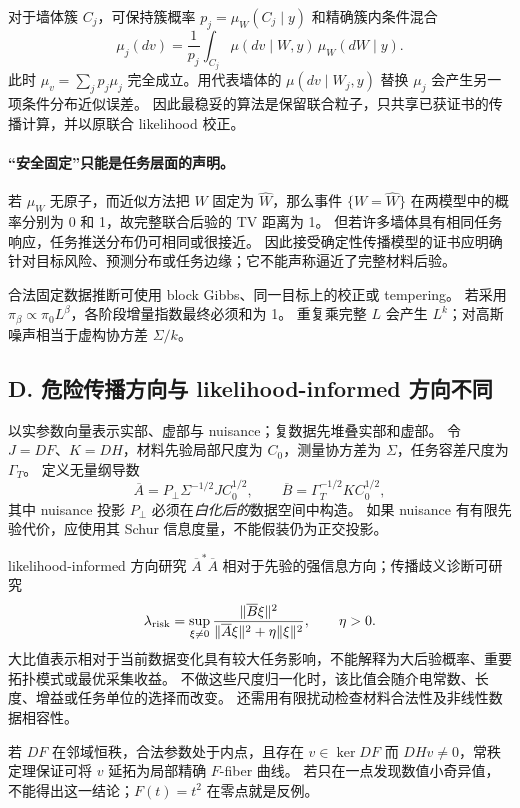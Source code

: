 对于墙体簇 $C_j$，可保持簇概率
$p_j=\mu_W(C_j\mid y)$ 和精确簇内条件混合
\[
 \mu_j(dv)=\frac{1}{p_j}\int_{C_j}\mu(dv\mid W,y)\,\mu_W(dW\mid y).
\]
此时 $\mu_v=\sum_jp_j\mu_j$ 完全成立。用代表墙体的
$\mu(dv\mid W_j,y)$ 替换 $\mu_j$ 会产生另一项条件分布近似误差。
因此最稳妥的算法是保留联合粒子，只共享已获证书的传播计算，并以原联合 likelihood 校正。

\paragraph{``安全固定''只能是任务层面的声明。}
若 $\mu_W$ 无原子，而近似方法把 $W$ 固定为 $\widehat W$，那么事件
$\{W=\widehat W\}$ 在两模型中的概率分别为 0 和 1，故完整联合后验的 TV 距离为 1。
但若许多墙体具有相同任务响应，任务推送分布仍可相同或很接近。
因此接受确定性传播模型的证书应明确针对目标风险、预测分布或任务边缘；它不能声称逼近了完整材料后验。

合法固定数据推断可使用 block Gibbs、同一目标上的校正或 tempering。
若采用 $\pi_\beta\propto\pi_0L^\beta$，各阶段增量指数最终必须和为 1。
重复乘完整 $L$ 会产生 $L^k$；对高斯噪声相当于虚构协方差 $\Sigma/k$。

\subsection*{D. 危险传播方向与 likelihood-informed 方向不同}

以实参数向量表示实部、虚部与 nuisance；复数据先堆叠实部和虚部。
令 $J=DF$、$K=DH$，材料先验局部尺度为 $C_0$，测量协方差为 $\Sigma$，任务容差尺度为 $\Gamma_T$。
定义无量纲导数
\[
 \overline A=P_\perp\Sigma^{-1/2}JC_0^{1/2},
 \qquad
 \overline B=\Gamma_T^{-1/2}KC_0^{1/2},
\]
其中 nuisance 投影 $P_\perp$ 必须在\emph{白化后的}数据空间中构造。
如果 nuisance 有有限先验代价，应使用其 Schur 信息度量，不能假装仍为正交投影。

likelihood-informed 方向研究 $\overline A^*\overline A$ 相对于先验的强信息方向；传播歧义诊断可研究
\[
 \lambda_{\rm risk}
 =\sup_{\xi\ne0}
 \frac{\lVert\overline B\xi\rVert^2}
 {\lVert\overline A\xi\rVert^2+\eta\lVert\xi\rVert^2},\qquad\eta>0.
\]
大比值表示相对于当前数据变化具有较大任务影响，不能解释为大后验概率、重要拓扑模式或最优采集收益。
不做这些尺度归一化时，该比值会随介电常数、长度、增益或任务单位的选择而改变。
还需用有限扰动检查材料合法性及非线性数据相容性。

若 $DF$ 在邻域恒秩，合法参数处于内点，且存在 $v\in\ker DF$ 而 $DHv\ne0$，常秩定理保证可将 $v$ 延拓为局部精确 $F$-fiber 曲线。
若只在一点发现数值小奇异值，不能得出这一结论；$F(t)=t^2$ 在零点就是反例。

